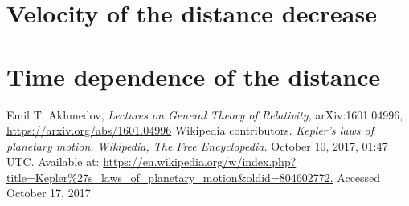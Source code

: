 \documentclass[]{article}
\begin{document}
\section{Velocity of the distance decrease}
\section{Time dependence of the distance}


\begin{thebibliography}{9}
	Emil T. Akhmedov,
	\emph{Lectures on General Theory of Relativity},
 	arXiv:1601.04996,
 	\url{https://arxiv.org/abs/1601.04996}
 	Wikipedia contributors.
 	\emph{Kepler's laws of planetary motion. Wikipedia, The Free Encyclopedia.}  October 10, 2017, 01:47 UTC. Available at: 
 	\url{https://en.wikipedia.org/w/index.php?title=Kepler%27s_laws_of_planetary_motion&oldid=804602772.} Accessed
 	October 17, 2017
\end{thebibliography}
\end{document}
